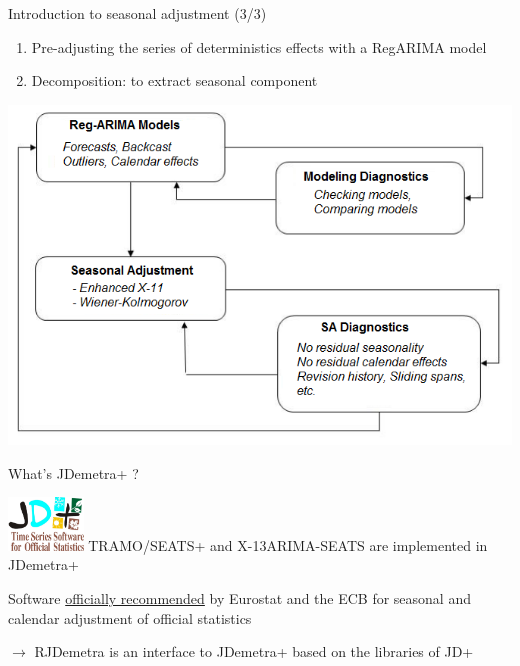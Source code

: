 \documentclass[10pt,xcolor=table,color={dvipsnames,usenames},ignorenonframetext,usepdftitle=false,french]{beamer}
\begin{document}
\begin{frame}{Introduction to seasonal adjustment (3/3)}
\protect\hypertarget{introduction-to-seasonal-adjustment-33}{}

\vspace{-0.15cm}

\begin{enumerate}
\item
  Pre-adjusting the series of deterministics effects with a RegARIMA
  model
\item
  Decomposition: to extract seasonal component
\end{enumerate}

\centering

\includegraphics[height=0.75\textheight]{img/sa_2_steps.png}

\end{frame}

\begin{frame}{What's JDemetra+ ?}
\protect\hypertarget{whats-jdemetra}{}

\includegraphics[width=2cm]{img/jdemetra+.jpg} TRAMO/SEATS+ and
X-13ARIMA-SEATS are implemented in JDemetra+

\bigskip

\large\faThumbsUp{} \normalsize Software
\href{https://ec.europa.eu/eurostat/cros/system/files/Jdemetra_\%20release.pdf}{officially
recommended} by Eurostat and the ECB for seasonal and calendar
adjustment of official statistics

\bigskip

\(\rightarrow\) RJDemetra is an \large\faRProject{}
\normalsize interface to JDemetra+ based on the \large\faJava{}
\normalsize libraries of JD+

\end{frame}
\end{document}
